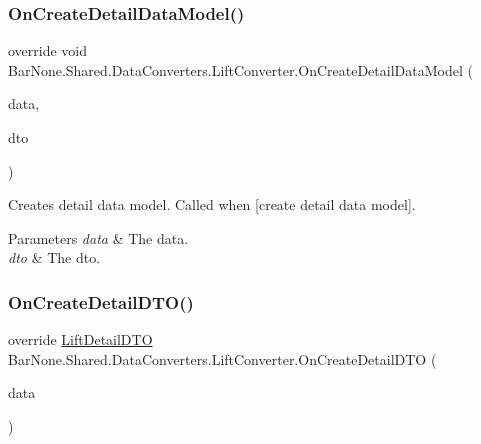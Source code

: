 \subsubsection{\texorpdfstring{On\+Create\+Detail\+Data\+Model()}{OnCreateDetailDataModel()}}
{\footnotesize\ttfamily override void Bar\+None.\+Shared.\+Data\+Converters.\+Lift\+Converter.\+On\+Create\+Detail\+Data\+Model (\begin{DoxyParamCaption}\item[{\mbox{\hyperlink{class_bar_none_1_1_shared_1_1_domain_model_1_1_lift}{Lift}}}]{data,  }\item[{\mbox{\hyperlink{class_bar_none_1_1_shared_1_1_data_transfer_1_1_lift_detail_d_t_o}{Lift\+Detail\+D\+TO}}}]{dto }\end{DoxyParamCaption})}



Creates detail data model. Called when \mbox{[}create detail data model\mbox{]}. 


\begin{DoxyParams}{Parameters}
{\em data} & The data.\\
\hline
{\em dto} & The dto.\\
\hline
\end{DoxyParams}
\mbox{\label{class_bar_none_1_1_shared_1_1_data_converters_1_1_lift_converter_adb3621365c88f653034fb51d1cc61719}} 
\subsubsection{\texorpdfstring{On\+Create\+Detail\+D\+T\+O()}{OnCreateDetailDTO()}}
{\footnotesize\ttfamily override \mbox{\hyperlink{class_bar_none_1_1_shared_1_1_data_transfer_1_1_lift_detail_d_t_o}{Lift\+Detail\+D\+TO}} Bar\+None.\+Shared.\+Data\+Converters.\+Lift\+Converter.\+On\+Create\+Detail\+D\+TO (\begin{DoxyParamCaption}\item[{\mbox{\hyperlink{class_bar_none_1_1_shared_1_1_domain_model_1_1_lift}{Lift}}}]{data }\end{DoxyParamCaption})}



